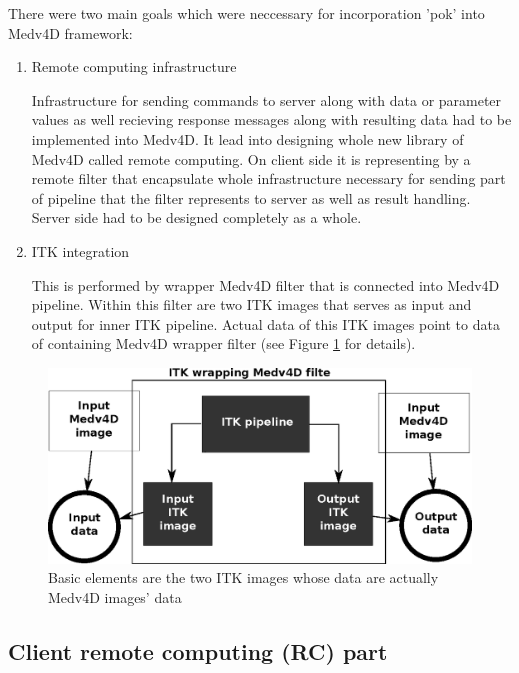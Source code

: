 \par
There were two main goals which were neccessary for incorporation 'pok' into
Medv4D framework:
\begin{enumerate}

  \item{Remote computing infrastructure}
  \par
  Infrastructure for sending commands to server along with data or parameter
values as well recieving response messages along with resulting data had to be
implemented into Medv4D. It lead into designing whole new library of Medv4D
called remote computing. On client side it is representing by a remote filter
that encapsulate whole infrastructure necessary for sending part of pipeline
that the filter represents to server as well as result handling. Server side had
to be designed completely as a whole.

  \item{ITK integration}
  \par
  This is performed by wrapper Medv4D filter that is connected into Medv4D pipeline. Within this filter are two ITK images that serves as input and output for inner ITK pipeline. Actual data of this ITK images point to data of containing Medv4D wrapper filter (see Figure \ref{fg:ITKWrapping} for details).

\end{enumerate}

\begin{figure}
    \centering
    \includegraphics[width=12cm]{data/ITKFilter.eps}
    \caption[ITK wrapper Medv4D filter]{Basic elements are the two ITK images whose data are actually Medv4D images' data}
    \label{fg:ITKWrapping}
\end{figure}

\subsection{Client remote computing (RC) part}

